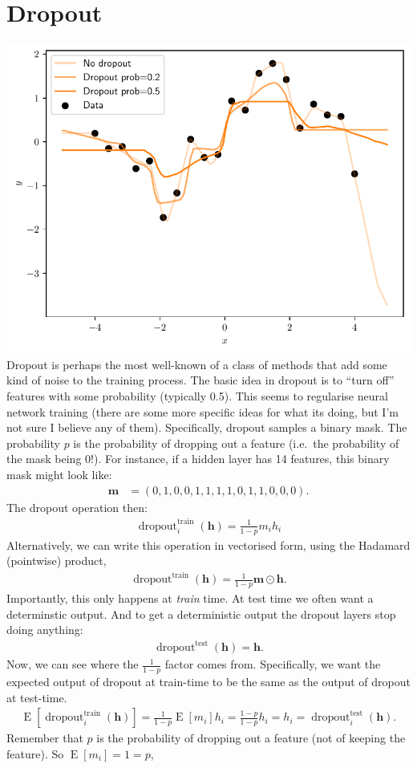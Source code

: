 \documentclass{article}
\newcommand{\bracket}[3]{\left#1 #3 \right#2}
\newcommand{\sqb}{\bracket{[}{]}}
\newcommand{\0}{\mathbf{0}}
\newcommand{\h}{\mathbf{h}}
\newcommand{\E}{\operatorname{E}\sqb}
\newcommand{\dropout}{\operatorname{dropout}}
\begin{document}
\section{Dropout}
\includegraphics[width=\textwidth]{dropout.pdf}
Dropout is perhaps the most well-known of a class of methods that add some kind of noise to the training process.
The basic idea in dropout is to ``turn off'' features with some probability (typically 0.5).
This seems to regularise neural network training (there are some more specific ideas for what its doing, but I'm not sure I believe any of them).
Specifically, dropout samples a binary mask. 
The probability $p$ is the probability of dropping out a feature (i.e.\ the probability of the mask being $0$!).
For instance, if a hidden layer has 14 features, this binary mask might look like:
\begin{align}
  \mathbf{m} &= (0, 1, 0, 0, 1, 1, 1, 1, 0, 1, 1, 0, 0, 0).
\end{align}
The dropout operation then:
\begin{align}
  \dropout_i^\text{train}(\h) = \tfrac{1}{1-p} m_i h_i
\end{align}
Alternatively, we can write this operation in vectorised form, using the Hadamard (pointwise) product,
\begin{align}
  \dropout^\text{train}(\h) = \tfrac{1}{1-p} \mathbf{m} \odot \mathbf{h}.
\end{align}
Importantly, this only happens at \textit{train} time.  At test time we often want a determinstic output.  And to get a deterministic output the dropout layers stop doing anything:
\begin{align}
  \dropout^\text{test}(\h) = \h.
\end{align}
Now, we can see where the $\tfrac{1}{1-p}$ factor comes from.
Specifically, we want the expected output of dropout at train-time to be the same as the output of dropout at test-time.
\begin{align}
  \E{\dropout_i^\text{train}(\h)} = \tfrac{1}{1-p} \E{m_i} h_i = \tfrac{1-p}{1-p} h_i = h_i = \dropout_i^\text{test}(\h).
\end{align}
Remember that $p$ is the probability of dropping out a feature (not of keeping the feature).  So $\E{m_i} = 1=p$,
\end{document}
